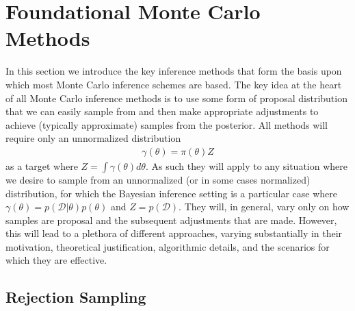 
\section{Foundational Monte Carlo Methods}
\label{sec:inf:foundation}

In this section we introduce the key inference methods that form
the basis upon which most Monte Carlo inference schemes are based.  The
key idea at the heart of all Monte Carlo inference methods is to use some form
of proposal distribution that we can easily sample from and then make
appropriate adjustments to achieve (typically approximate) samples from
the posterior.  All methods will require only an unnormalized distribution
\begin{align}
\label{eq:inf:unnorm-target}
\gamma(\theta) = \pi(\theta)Z
\end{align}
as a target where $Z = \int \gamma(\theta) d\theta$.  As such they will apply to
any situation where we desire to sample from an unnormalized 
(or in some cases normalized) distribution, for which
the Bayesian inference setting is a particular case where
$\gamma(\theta) = p(\mathcal{D}|\theta)p(\theta)$ and $Z = p(\mathcal{D})$.
They will, in general, vary only on how samples are proposal
and the subsequent adjustments that are made.  However, this will lead to a
plethora of different approaches, varying substantially in their motivation,
theoretical justification, algorithmic details, and the scenarios for which they
are effective.

\subsection{Rejection Sampling}
\label{sec:inf:foundation:rejection}

